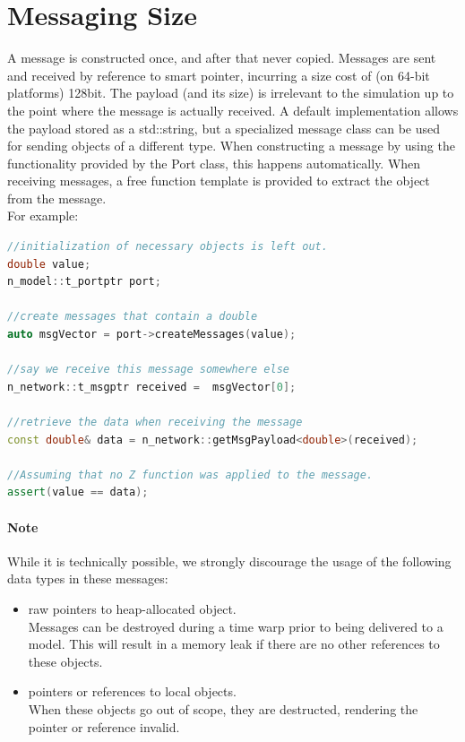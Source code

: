 \documentclass[8pt,a4paper]{report}
\begin{document}
\section{Messaging Size}
A message is constructed once, and after that never copied. Messages are sent and received by reference to smart pointer, incurring a size cost of (on 64-bit platforms) 128bit. The payload (and its size) is irrelevant to the simulation up to the point where the message is actually received. A default implementation allows the payload stored as a std::string, but a specialized message class can be used for sending objects of a different type. When constructing a message by using the functionality provided by the Port class, this happens automatically. When receiving messages, a free function template is provided to extract the object from the message.\\
For example:
\begin{lstlisting}[language=C++,basicstyle=\small\color{black}]
//initialization of necessary objects is left out.
double value;
n_model::t_portptr port;

//create messages that contain a double
auto msgVector = port->createMessages(value);

//say we receive this message somewhere else
n_network::t_msgptr received =  msgVector[0];

//retrieve the data when receiving the message
const double& data = n_network::getMsgPayload<double>(received);

//Assuming that no Z function was applied to the message.
assert(value == data);
\end{lstlisting}
\paragraph{Note} While it is technically possible, we strongly discourage the usage of the following data types in these messages:
\begin{itemize}
	\item raw pointers to heap-allocated object.\\
			Messages can be destroyed during a time warp prior to being delivered to a model. This will result in a memory leak if there are no other references to these objects.
	\item pointers or references to local objects.\\
		When these objects go out of scope, they are destructed, rendering the pointer or reference invalid.
\end{itemize}
\end{document}
